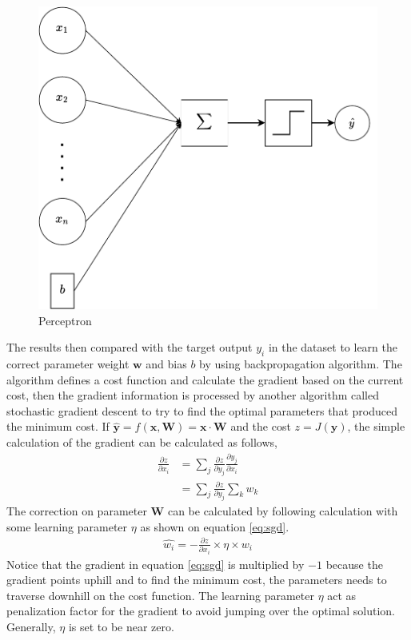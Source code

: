     \begin{figure}
        \centering
        \includegraphics[width=.5\linewidth]{images/perceptron.pdf}
        \caption{Perceptron}
        \label{fig:perceptron}
    \end{figure}
    
    The results then compared with the target output $y_i$ in the
    dataset to learn the correct parameter weight $\mathbf{w}$ and
    bias $b$ by using backpropagation algorithm. The algorithm defines
    a cost function and calculate the gradient based on the current
    cost, then the gradient information is processed by another
    algorithm called stochastic gradient descent to try to find the
    optimal parameters that produced the minimum cost. If
    $\mathbf{\hat{y}} = f(\mathbf{x}, \mathbf{W}) = \mathbf{x} \cdot
    \mathbf{W}$ and the cost $z = J(\mathbf{y})$, the simple
    calculation of the gradient can be calculated as follows,
    \begin{align}
        \label{eq:gradient1}
        \frac{\partial z}{\partial x_i} &= \sum_j \frac{\partial z}{\partial y_j} \frac{\partial y_j}{\partial x_i}\\
        \label{eq:gradient2}        
        &= \sum_j \frac{\partial z}{\partial y_j} \sum_k w_k
    \end{align}
    The correction on parameter $\mathbf{W}$ can be calculated by
    following calculation with some learning parameter $\eta$ as shown
    on equation \ref{eq:sgd}.
    \begin{align}
        \label{eq:sgd}
        \hat{w_i} = -\frac{\partial z}{\partial x_i} \times \eta \times w_i
    \end{align}
    Notice that the gradient in equation \ref{eq:sgd} is multiplied by
    $-1$ because the gradient points uphill and to find the minimum
    cost, the parameters needs to traverse downhill on the cost
    function. The learning parameter $\eta$ act as penalization factor
    for the gradient to avoid jumping over the optimal solution.
    Generally, $\eta$ is set to be near zero.
    
